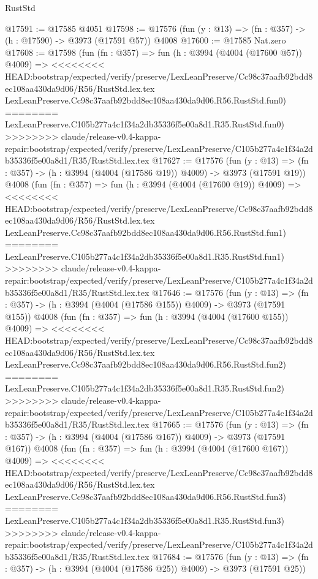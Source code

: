 \begin{lexlean}{RustStd}
\begin{coremodule}
{\begin{coremodule}
{{{{{{{{{{{{{{{{@17591 := @17585 @4051
@17598 := @17576 (fun (y : @13) => (fn : @357) -> (h : @17590) -> @3973 (@17591 @57)) @4008
@17600 := @17585 Nat.zero
@17608 := @17598
    (fun (fn : @357) =>
    fun (h : @3994 (@4004 (@17600 @57)) @4009) =>
<<<<<<<< HEAD:bootstrap/expected/verify/preserve/LexLeanPreserve/Cc98c37aafb92bdd8ec108aa430da9d06/R56/RustStd.lex.tex
    LexLeanPreserve.Cc98c37aafb92bdd8ec108aa430da9d06.R56.RustStd.fun0)
========
    LexLeanPreserve.C105b277a4c1f34a2db35336f5e00a8d1.R35.RustStd.fun0)
>>>>>>>> claude/release-v0.4-kappa-repair:bootstrap/expected/verify/preserve/LexLeanPreserve/C105b277a4c1f34a2db35336f5e00a8d1/R35/RustStd.lex.tex
@17627 := @17576
    (fun (y : @13) => (fn : @357) -> (h : @3994 (@4004 (@17586 @19)) @4009) -> @3973 (@17591 @19))
    @4008
    (fun (fn : @357) =>
    fun (h : @3994 (@4004 (@17600 @19)) @4009) =>
<<<<<<<< HEAD:bootstrap/expected/verify/preserve/LexLeanPreserve/Cc98c37aafb92bdd8ec108aa430da9d06/R56/RustStd.lex.tex
    LexLeanPreserve.Cc98c37aafb92bdd8ec108aa430da9d06.R56.RustStd.fun1)
========
    LexLeanPreserve.C105b277a4c1f34a2db35336f5e00a8d1.R35.RustStd.fun1)
>>>>>>>> claude/release-v0.4-kappa-repair:bootstrap/expected/verify/preserve/LexLeanPreserve/C105b277a4c1f34a2db35336f5e00a8d1/R35/RustStd.lex.tex
@17646 := @17576
    (fun (y : @13) => (fn : @357) -> (h : @3994 (@4004 (@17586 @155)) @4009) -> @3973 (@17591 @155))
    @4008
    (fun (fn : @357) =>
    fun (h : @3994 (@4004 (@17600 @155)) @4009) =>
<<<<<<<< HEAD:bootstrap/expected/verify/preserve/LexLeanPreserve/Cc98c37aafb92bdd8ec108aa430da9d06/R56/RustStd.lex.tex
    LexLeanPreserve.Cc98c37aafb92bdd8ec108aa430da9d06.R56.RustStd.fun2)
========
    LexLeanPreserve.C105b277a4c1f34a2db35336f5e00a8d1.R35.RustStd.fun2)
>>>>>>>> claude/release-v0.4-kappa-repair:bootstrap/expected/verify/preserve/LexLeanPreserve/C105b277a4c1f34a2db35336f5e00a8d1/R35/RustStd.lex.tex
@17665 := @17576
    (fun (y : @13) => (fn : @357) -> (h : @3994 (@4004 (@17586 @167)) @4009) -> @3973 (@17591 @167))
    @4008
    (fun (fn : @357) =>
    fun (h : @3994 (@4004 (@17600 @167)) @4009) =>
<<<<<<<< HEAD:bootstrap/expected/verify/preserve/LexLeanPreserve/Cc98c37aafb92bdd8ec108aa430da9d06/R56/RustStd.lex.tex
    LexLeanPreserve.Cc98c37aafb92bdd8ec108aa430da9d06.R56.RustStd.fun3)
========
    LexLeanPreserve.C105b277a4c1f34a2db35336f5e00a8d1.R35.RustStd.fun3)
>>>>>>>> claude/release-v0.4-kappa-repair:bootstrap/expected/verify/preserve/LexLeanPreserve/C105b277a4c1f34a2db35336f5e00a8d1/R35/RustStd.lex.tex
@17684 := @17576
    (fun (y : @13) => (fn : @357) -> (h : @3994 (@4004 (@17586 @25)) @4009) -> @3973 (@17591 @25))
}}}}}}}}}}}}}}}}
\end{coremodule}}
\end{coremodule}
\end{lexlean}
